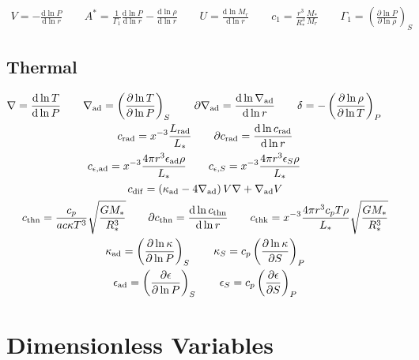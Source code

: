 \documentclass[fleqn]{article}
\newcommand{\diff}{\mathrm{d}}
\newcommand{\As}{A^{\ast}}
\newcommand{\nabad}{\nabla_{\rm ad}}
\newcommand{\kapad}{\kappa_{\rm ad}}
\newcommand{\kapS}{\kappa_{S}}
\newcommand{\epsad}{\epsilon_{\rm ad}}
\newcommand{\epsS}{\epsilon_{S}}
\newcommand{\crad}{c_{\rm rad}}
\newcommand{\cepsad}{c_{\epsilon,{\rm ad}}}
\newcommand{\cepsS}{c_{\epsilon,S}}
\newcommand{\cdif}{c_{\rm dif}}
\newcommand{\cthn}{c_{\rm thn}}
\newcommand{\cthk}{c_{\rm thk}}
\newcommand{\Rstar}{R_{\ast}}
\newcommand{\Mstar}{M_{\ast}}
\newcommand{\Lrad}{L_{\rm rad}}
\newcommand{\Lstar}{L_{\ast}}
\begin{document}
\begin{gather*}
V = -\frac{\diff \ln P}{\diff \ln r} \qquad
\As = \frac{1}{\Gamma_{1}} \frac{\diff \ln P}{\diff \ln r} - \frac{\diff \ln \rho}{\diff \ln r} \qquad
U = \frac{\diff \ln M_{r}}{\diff \ln r} \qquad
c_1 = \frac{r^{3}}{\Rstar^{3}} \frac{\Mstar}{M_{r}} \qquad
\Gamma_{1} = \left( \frac{\partial \ln P}{\partial \ln \rho} \right)_{S}
\end{gather*}

\subsection*{Thermal}

\begin{gather*}
\nabla = \frac{\diff \ln T}{\diff \ln P} \qquad
\nabad = \left( \frac{\partial \ln T}{\partial \ln P} \right)_{S} \qquad
\partial\nabad = \frac{\diff \ln \nabad}{\diff \ln r} \qquad
\delta = - \left( \frac{\partial \ln \rho}{\partial \ln T} \right)_{P} \qquad \\
\crad = x^{-3} \frac{\Lrad}{\Lstar} \qquad
\partial\crad = \frac{\diff \ln \crad}{\diff \ln r} \\
\cepsad = x^{-3} \frac{4\pi r^{3} \epsad \rho}{\Lstar} \qquad
\cepsS = x^{-3} \frac{4\pi r^{3} \epsS \rho}{\Lstar} \qquad \\
\cdif = \left( \kapad - 4 \nabad \right) V \nabla + \nabad V \\
\cthn = \frac{c_{p}}{a c \kappa T^{3}} \sqrt{\frac{G\Mstar}{\Rstar^{3}}} \qquad
\partial\cthn = \frac{\diff \ln \cthn}{\diff \ln r} \qquad
\cthk = x^{-3} \frac{4\pi r^{3} c_{p} T \rho}{\Lstar} \sqrt{\frac{G\Mstar}{\Rstar^{3}}} \\
\kapad = \left( \frac{\partial \ln \kappa}{\partial \ln P} \right)_{S} \qquad
\kapS = c_{p} \left( \frac{\partial \ln \kappa}{\partial S} \right)_{P} \\
\epsad = \left( \frac{\partial \epsilon}{\partial \ln P} \right)_{S} \qquad
\epsS = c_{p} \left( \frac{\partial \epsilon}{\partial S} \right)_{P}
\end{gather*}


\section*{Dimensionless Variables}
\end{document}
